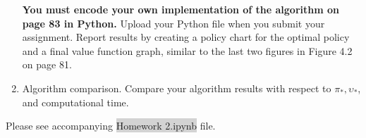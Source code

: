 \documentclass[12pt,letterpaper]{exam}
\begin{document}
\begin{questions}
\begin{enumerate}[label= (\alph*)]
		\textbf{You must encode your own implementation of the algorithm on page 83 in Python.} 
		Upload your Python file when you submit your assignment. 
		Report results by creating a policy chart for the optimal policy and a final value function graph, 
		similar to the last two figures in Figure 4.2 on page 81.
		\item 
		Algorithm comparison. Compare your algorithm results with respect to \(\pi_*,\upsilon_*\),
		and computational time.
	\end{enumerate}
	\begin{solution}
		Please see accompanying \colorbox{lightgray}{Homework 2.ipynb} file.
	\end{solution}

\end{questions}
\printbibliography%
\end{document}
